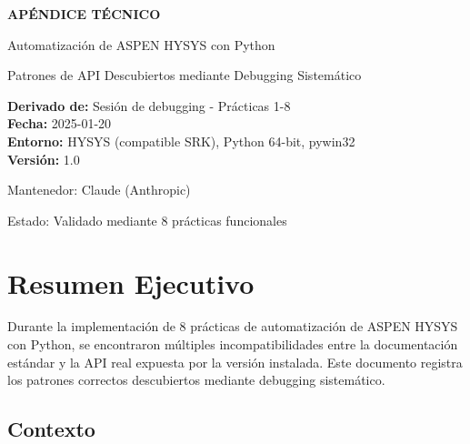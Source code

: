 \documentclass[12pt,a4paper]{article}
\begin{document}
\begin{titlepage}
    \centering
    \vspace*{2cm}

    {\Huge\bfseries APÉNDICE TÉCNICO\par}
    \vspace{1cm}
    {\LARGE Automatización de ASPEN HYSYS con Python\par}
    \vspace{0.5cm}
    {\Large Patrones de API Descubiertos mediante Debugging Sistemático\par}

    \vspace{3cm}

    \begin{tcolorbox}[colback=gray!10,colframe=gray!50,width=0.8\textwidth]
        \centering
        \textbf{Derivado de:} Sesión de debugging - Prácticas 1-8\\
        \textbf{Fecha:} 2025-01-20\\
        \textbf{Entorno:} HYSYS (compatible SRK), Python 64-bit, pywin32\\
        \textbf{Versión:} 1.0
    \end{tcolorbox}

    \vfill

    {\large Mantenedor: Claude (Anthropic)\par}
    {\large Estado: Validado mediante 8 prácticas funcionales\par}

    \vspace{1cm}
\end{titlepage}

\tableofcontents
\newpage

\section{Resumen Ejecutivo}

Durante la implementación de 8 prácticas de automatización de ASPEN HYSYS con Python, se encontraron múltiples incompatibilidades entre la documentación estándar y la API real expuesta por la versión instalada. Este documento registra los patrones correctos descubiertos mediante debugging sistemático.

\subsection{Contexto}
\end{document}
